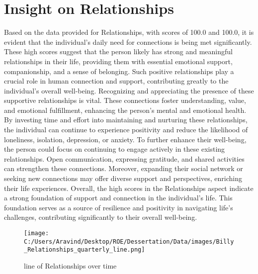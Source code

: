 \documentclass[10pt, a4paper]{article}%
\begin{document}
\section{Insight on Relationships}%
\label{sec:InsightonRelationships}%
Based on the data provided for Relationships, with scores of 100.0 and 100.0, it is evident that the individual's daily need for connections is being met significantly. These high scores suggest that the person likely has strong and meaningful relationships in their life, providing them with essential emotional support, companionship, and a sense of belonging. Such positive relationships play a crucial role in human connection and support, contributing greatly to the individual's overall well{-}being.\newline%
\newline%
Recognizing and appreciating the presence of these supportive relationships is vital. These connections foster understanding, value, and emotional fulfillment, enhancing the person's mental and emotional health. By investing time and effort into maintaining and nurturing these relationships, the individual can continue to experience positivity and reduce the likelihood of loneliness, isolation, depression, or anxiety.\newline%
\newline%
To further enhance their well{-}being, the person could focus on continuing to engage actively in these existing relationships. Open communication, expressing gratitude, and shared activities can strengthen these connections. Moreover, expanding their social network or seeking new connections may offer diverse support and perspectives, enriching their life experiences.\newline%
\newline%
Overall, the high scores in the Relationships aspect indicate a strong foundation of support and connection in the individual's life. This foundation serves as a source of resilience and positivity in navigating life's challenges, contributing significantly to their overall well{-}being.%
\begin{figure}[H]%
\centering%
\texttt{[image: C:/Users/Aravind/Desktop/ROE/Dessertation/Data/images/Billy\_Relationships\_quarterly\_line.png]}%
\caption{line of Relationships over time}%
\end{figure}

%
\end{document}
